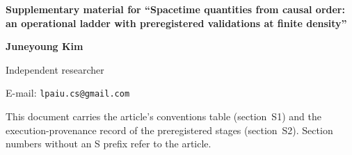 \documentclass[12pt]{article}
\begin{document}

{\noindent\raggedright\large\bfseries Supplementary material for
``Spacetime quantities from causal order: an operational ladder with
preregistered validations at finite density''\par}\vspace{0.8em}
{\noindent\bfseries Juneyoung Kim\par}\vspace{0.25em}
{\noindent Independent researcher\par}
{\noindent E-mail: \texttt{lpaiu.cs@gmail.com}\par}\vspace{0.8em}

\noindent This document carries the article's conventions table
(section~S1) and the execution-provenance record of the preregistered
stages (section~S2). Section numbers without an S prefix refer to the
article.



\end{document}
